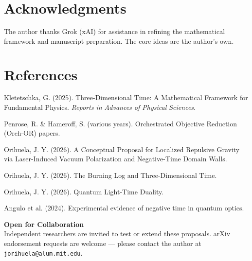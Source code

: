 \documentclass[11pt,a4paper]{article}
\begin{document}
\section*{Acknowledgments}
The author thanks Grok (xAI) for assistance in refining the mathematical framework and manuscript preparation. The core ideas are the author’s own.

\section*{References}
\begin{enumerate}[leftmargin=*,label={[\arabic*]}]
    \item Kletetschka, G. (2025). Three-Dimensional Time: A Mathematical Framework for Fundamental Physics. \textit{Reports in Advances of Physical Sciences}.
    \item Penrose, R. \& Hameroff, S. (various years). Orchestrated Objective Reduction (Orch-OR) papers.
    \item Orihuela, J. Y. (2026). A Conceptual Proposal for Localized Repulsive Gravity via Laser-Induced Vacuum Polarization and Negative-Time Domain Walls.
    \item Orihuela, J. Y. (2026). The Burning Log and Three-Dimensional Time.
    \item Orihuela, J. Y. (2026). Quantum Light-Time Duality.
    \item Angulo et al. (2024). Experimental evidence of negative time in quantum optics.
\end{enumerate}

\vspace{2em}
\footnotesize
\noindent \textbf{Open for Collaboration} \\
Independent researchers are invited to test or extend these proposals. arXiv endorsement requests are welcome — please contact the author at \texttt{jorihuela@alum.mit.edu}.
\end{document}
